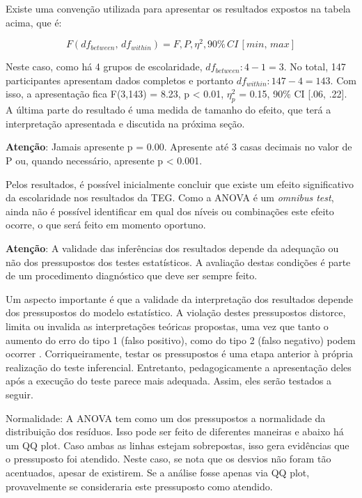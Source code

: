 \documentclass[
]{book}
\begin{document}
Existe uma convenção utilizada para apresentar os resultados expostos na tabela acima, que é:

\[F(df_{between}, \, df_{within}) = F, P, \eta^2, 90\% \,CI \, [min, \, max]\]

Neste caso, como há 4 grupos de escolaridade, \(df_{between}: 4-1=3\). No total, 147 participantes apresentam dados completos e portanto \(df_{within}: 147-4 = 143\). Com isso, a apresentação fica F(3,143) = 8.23, p \textless{} 0.01, \(\eta_p^2\) = 0.15, 90\% CI {[}.06, .22{]}. A última parte do resultado é uma medida de tamanho do efeito, que terá a interpretação apresentada e discutida na próxima seção.

\textbf{Atenção}: Jamais apresente p = 0.00. Apresente até 3 casas decimais no valor de P ou, quando necessário, apresente p \textless{} 0.001.

Pelos resultados, é possível inicialmente concluir que existe um efeito significativo da escolaridade nos resultados da TEG. Como a ANOVA é um \emph{omnibus test}, ainda não é possível identificar em qual dos níveis ou combinações este efeito ocorre, o que será feito em momento oportuno.

\textbf{Atenção}: A validade das inferências dos resultados depende da adequação ou não dos pressupostos dos testes estatísticos. A avaliação destas condições é parte de um procedimento diagnóstico que deve ser sempre feito.

Um aspecto importante é que a validade da interpretação dos resultados depende dos pressupostos do modelo estatístico. A violação destes pressupostos distorce, limita ou invalida as interpretações teóricas propostas, uma vez que tanto o aumento do erro do tipo 1 (falso positivo), como do tipo 2 (falso negativo) podem ocorrer \citep{Lix1996, Barker2015, Ernst2017}. Corriqueiramente, testar os pressupostos é uma etapa anterior à própria realização do teste inferencial. Entretanto, pedagogicamente a apresentação deles após a execução do teste parece mais adequada. Assim, eles serão testados a seguir.

Normalidade: A ANOVA tem como um dos pressupostos a normalidade da distribuição dos resíduos. Isso pode ser feito de diferentes maneiras e abaixo há um QQ plot. Caso ambas as linhas estejam sobrepostas, isso gera evidências que o pressuposto foi atendido. Neste caso, se nota que os desvios não foram tão acentuados, apesar de existirem. Se a análise fosse apenas via QQ plot, provavelmente se consideraria este pressuposto como atendido.
\end{document}

